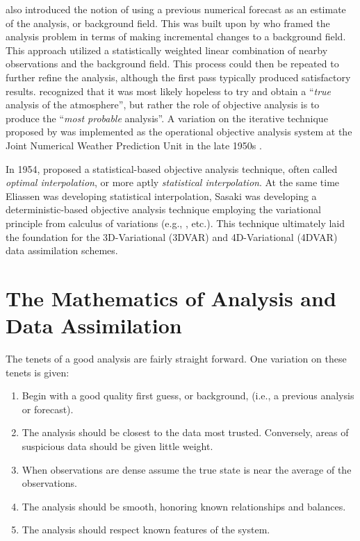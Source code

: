 \cite{gilchrist1954oban} also introduced the notion of using a previous numerical forecast as an estimate of the analysis, or background field. This was built upon by \cite{bergthorsson1955numerical} who framed the analysis problem in terms of making incremental changes to a background field. This approach utilized a statistically weighted linear combination of nearby observations and the background field. This process could then be repeated to further refine the analysis, although the first pass typically produced satisfactory results. \cite{bergthorsson1955numerical} recognized that it was most likely hopeless to try and obtain a ``\emph{true} analysis of the atmosphere'', but rather the role of objective analysis is to produce the ``\emph{most probable} analysis''. A variation on the iterative technique proposed by \cite{bergthorsson1955numerical} was implemented as the operational objective analysis system at the Joint Numerical Weather Prediction Unit in the late 1950s \citep{cressman1959operational}.


In 1954, \cite{eliassen1954oi} proposed a statistical-based objective analysis technique, often called \emph{optimal interpolation}, or more aptly \emph{statistical interpolation}. At the same time Eliassen was developing statistical interpolation, Sasaki was developing a deterministic-based objective analysis technique employing the variational principle from calculus of variations (e.g., \citealp{sasaki1955variational, sasaki1958objective, sasaki19694dvariational, sasaki1970variational, sasaki1970numerical, sasaki1970weakconstraint}, etc.). This technique ultimately laid the foundation for the 3D-Variational (3DVAR) and 4D-Variational (4DVAR) data assimilation schemes.



\section{The Mathematics of Analysis and Data Assimilation}
\label{The Mathematics of Analysis and Data Assimilation}

The tenets of a good analysis are fairly straight forward. One variation on these tenets is given:


    \begin{enumerate}
        \item Begin with a good quality first guess, or background, (i.e., a previous analysis or forecast).
        \item The analysis should be closest to the data most trusted. Conversely, areas of suspicious data should be given little weight.
        \item When observations are dense assume the true state is near the average of the observations.
        \item The analysis should be smooth, honoring known relationships and balances.
        \item The analysis should respect known features of the system.
    \end{enumerate}


